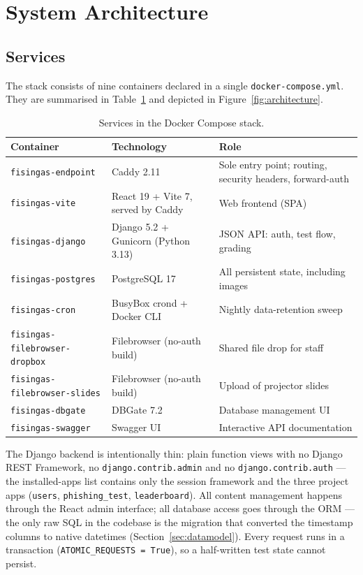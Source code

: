 \documentclass[11pt,a4paper]{article}
\newcommand{\code}[1]{\texttt{#1}}
\begin{document}
\section{System Architecture}
\label{sec:architecture}

\subsection{Services}

The stack consists of nine containers declared in a single
\code{docker-compose.yml}. They are summarised in
Table~\ref{tab:services} and depicted in Figure~\ref{fig:architecture}.

\begin{table}[h]
\centering
\small
\begin{tabular}{@{}lll@{}}
\toprule
\textbf{Container} & \textbf{Technology} & \textbf{Role} \\
\midrule
\code{fisingas-endpoint} & Caddy 2.11 & Sole entry point; routing, security headers, forward-auth \\
\code{fisingas-vite}     & React 19 + Vite 7, served by Caddy & Web frontend (SPA) \\
\code{fisingas-django}   & Django 5.2 + Gunicorn (Python 3.13) & JSON API: auth, test flow, grading \\
\code{fisingas-postgres} & PostgreSQL 17 & All persistent state, including images \\
\code{fisingas-cron}     & BusyBox crond + Docker CLI & Nightly data-retention sweep \\
\code{fisingas-filebrowser-dropbox} & Filebrowser (no-auth build) & Shared file drop for staff \\
\code{fisingas-filebrowser-slides}  & Filebrowser (no-auth build) & Upload of projector slides \\
\code{fisingas-dbgate}   & DBGate 7.2 & Database management UI \\
\code{fisingas-swagger}  & Swagger UI & Interactive API documentation \\
\bottomrule
\end{tabular}
\caption{Services in the Docker Compose stack.}
\label{tab:services}
\end{table}

The Django backend is intentionally thin: plain function views with no
Django REST Framework, no \code{django.contrib.admin} and no
\code{django.contrib.auth} --- the installed-apps list contains only
the session framework and the three project apps (\code{users},
\code{phishing\_test}, \code{leaderboard}). All content management
happens through the React admin interface; all database access goes
through the ORM --- the only raw SQL in the codebase is the migration
that converted the timestamp columns to native datetimes
(Section~\ref{sec:datamodel}). Every request runs in a transaction (\code{ATOMIC\_REQUESTS = True}), so a
half-written test state cannot persist.
\end{document}
